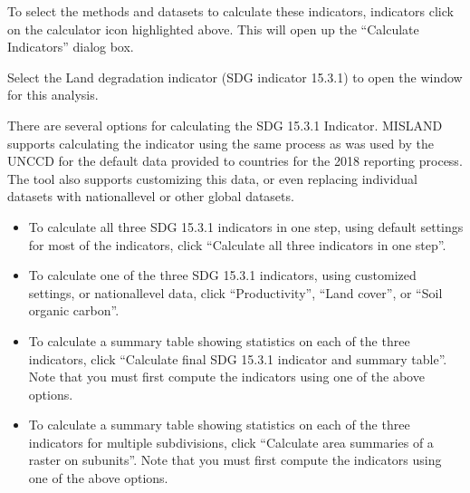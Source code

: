 \documentclass[letterpaper,10pt,english]{sphinxmanual}
\begin{document}
\sphinxAtStartPar
To select the methods and datasets to calculate these indicators, indicators
click on the calculator icon highlighted above. This will open up the
“Calculate Indicators” dialog box.


\sphinxAtStartPar
Select the Land degradation indicator (SDG indicator 15.3.1) to open the window for this analysis.


\sphinxAtStartPar
There are several options for calculating the SDG 15.3.1 Indicator.
MISLAND supports calculating the indicator using the same process as was
used by the UNCCD for the default data provided to countries for the 2018
reporting process. The tool also supports customizing this data, or even
replacing individual datasets with national\sphinxhyphen{}level or other global datasets.
\begin{itemize}
\item {} 
\sphinxAtStartPar
To calculate all three SDG 15.3.1 indicators in one step, using default
settings for most of the indicators, click “Calculate all three indicators in
one step”.

\item {} 
\sphinxAtStartPar
To calculate one of the three SDG 15.3.1 indicators, using customized
settings, or national\sphinxhyphen{}level data, click “Productivity”, “Land cover”, or
“Soil organic carbon”.

\item {} 
\sphinxAtStartPar
To calculate a summary table showing statistics on each of the three
indicators, click “Calculate final SDG 15.3.1 indicator and summary table”.
Note that you must first compute the indicators using one of the above
options.

\item {} 
\sphinxAtStartPar
To calculate a summary table showing statistics on each of the three
indicators for multiple sub\sphinxhyphen{}divisions, click “Calculate area summaries of a raster on sub\sphinxhyphen{}units”.
Note that you must first compute the indicators using one of the above
options.

\end{itemize}
\end{document}

